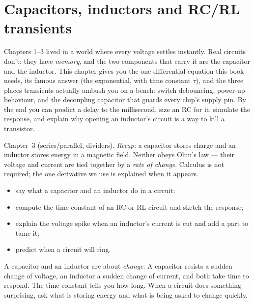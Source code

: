 \chapter{Capacitors, inductors and RC/RL transients}
\label{ch:transients}

Chapters 1--3 lived in a world where every voltage settles instantly. Real
circuits don't: they have \emph{memory}, and the two components that carry it
are the capacitor and the inductor. This chapter gives you the one
differential equation this book needs, its famous answer (the exponential,
with time constant $\tau$), and the three places transients actually ambush
you on a bench: switch debouncing, power-up behaviour, and the decoupling
capacitor that guards every chip's supply pin. By the end you can predict a
delay to the millisecond, size an RC for it, simulate the response, and
explain why opening an inductor's circuit is a way to kill a transistor.

\begin{rulebox}
Chapter~3 (series/parallel, dividers). \emph{Recap:} a capacitor stores charge and an inductor stores energy in a magnetic field. Neither obeys Ohm's law --- their voltage and current are tied together by a \emph{rate of change}. Calculus is not required; the one derivative we use is explained when it appears.
\end{rulebox}
\begin{wins}
\begin{itemize}
\item say what a capacitor and an inductor do in a circuit;
\item compute the time constant of an RC or RL circuit and sketch the response;
\item explain the voltage spike when an inductor's current is cut and add a part to tame it;
\item predict when a circuit will ring.
\end{itemize}
\end{wins}
\begin{principle}
A capacitor and an inductor are about \emph{change}. A capacitor resists a sudden change of voltage, an inductor a sudden change of current, and both take time to respond. The time constant tells you how long. When a circuit does something surprising, ask what is storing energy and what is being asked to change quickly.
\end{principle}

